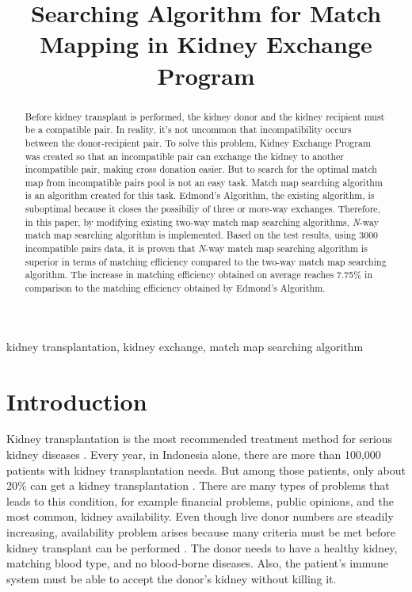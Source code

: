 \documentclass[conference]{IEEEtran}
\begin{document}
\title{Searching Algorithm for Match Mapping in Kidney Exchange Program}

\author{
\and
{}
\and
{}
}

\maketitle

\begin{abstract}
Before kidney transplant is performed, the kidney donor and the kidney recipient must
be a compatible pair. In reality, it's not uncommon that incompatibility occurs between the donor-recipient pair.
To solve this problem, Kidney Exchange Program was created so that an incompatible pair can exchange the kidney
to another incompatible pair, making cross donation easier. But to search for the optimal match map from incompatible
pairs pool is not an easy task. Match map searching algorithm is an algorithm created for this task. Edmond's
Algorithm, the existing algorithm, is suboptimal because it closes the possibiliy of three or more-way exchanges.
Therefore, in this paper, by modifying existing two-way match map searching algorithms, \textit{N}-way match
map searching algorithm is implemented. Based on the test results, using 3000 incompatible pairs data, it is
proven that \textit{N}-way match map searching algorithm is superior in terms of matching efficiency compared to
the two-way match map searching algorithm. The increase in matching efficiency obtained on average reaches 7.75\%
in comparison to the matching efficiency obtained by Edmond's Algorithm. 
\end{abstract}

\begin{IEEEkeywords}
kidney transplantation, kidney exchange, match map searching algorithm
\end{IEEEkeywords}

\section{Introduction}
Kidney transplantation is the most recommended treatment method for serious kidney diseases \cite{roth2005}.
Every year, in Indonesia alone, there are more than 100,000 patients with kidney transplantation needs. But among
those patients, only about 20\% can get a kidney transplantation \cite{wiradarma}. There are many types
of problems that leads to this condition, for example financial problems, public opinions, and the most
common, kidney availability.
Even though live donor numbers are steadily increasing\cite{roth2006}, availability problem arises because many criteria must
be met before kidney transplant can be performed \cite{wiradarma}. The donor needs to have a healthy kidney,
matching blood type, and no blood-borne diseases. Also, the patient's immune system must be able to accept
the donor's kidney without killing it.
\end{document}
